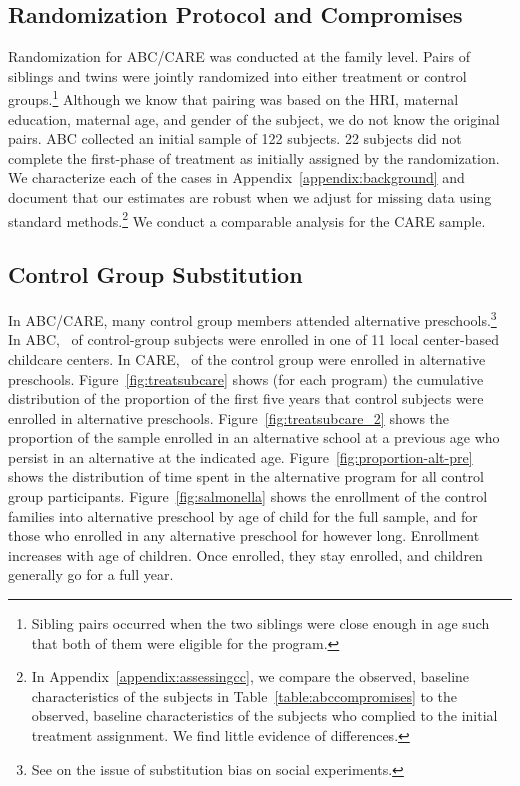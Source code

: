 \subsection{Randomization Protocol and Compromises} \label{section:randomization}

Randomization for ABC/CARE was conducted at the family level. Pairs of siblings and twins were jointly randomized into either treatment or control groups.\footnote{Sibling pairs occurred when the two siblings were close enough in age such that both of them were eligible for the program.} Although we know that pairing was based on the HRI, maternal education, maternal age, and gender of the subject, we do not know the original pairs. ABC collected an initial sample of 122 subjects. 22 subjects did not complete the first-phase of treatment as initially assigned by the randomization. We characterize each of the cases in Appendix~\ref{appendix:background} and document that our estimates are robust when we adjust for missing data using standard methods.\footnote{In Appendix~\ref{appendix:assessingcc}, we compare the observed, baseline characteristics of the subjects in Table~\ref{table:abccompromises} to the observed, baseline characteristics of the subjects who complied to the initial treatment assignment. We find little evidence of differences.} We conduct a comparable analysis for the CARE sample.

\subsection{Control Group Substitution}

In ABC/CARE, many control group members attended alternative preschools.\footnote{See \cite{Heckman_Hohmann_etal_2000_QJE} on the issue of substitution bias on social experiments.} In ABC, \treatsubsabc\ of control-group subjects were enrolled in one of 11 local center-based childcare centers. In CARE, \treatsubscarec\ of the control group were enrolled in alternative preschools. Figure~\ref{fig:treatsubcare} shows (for each program) the cumulative distribution of the proportion of the first five years that control subjects were enrolled in alternative preschools. Figure~\ref{fig:treatsubcare_2} shows the proportion of the sample enrolled in an alternative school at a previous age who persist in an alternative at the indicated age. Figure~\ref{fig:proportion-alt-pre} shows the distribution of time spent in the alternative program for all control group participants. Figure~\ref{fig:salmonella} shows the enrollment of the control families into alternative preschool by age of child for the full sample, and for those who enrolled in any alternative preschool for however long. Enrollment increases with age of children. Once enrolled, they stay enrolled, and children generally go for a full year.

